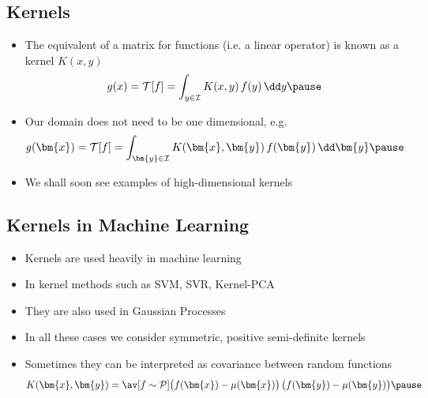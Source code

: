 \begin{slide}
\section{Kernels}

\begin{PauseHighLight}
  \begin{itemize}
  \item The equivalent of a matrix for functions (i.e. a linear
    operator) is known as a kernel $K(x,y)$
    \begin{align*}
      g(x) = \mathcal{T}[f] = \int_{y\in\mathcal{I}} K(x,y)\, f(y) \,
      \dd y\pause
    \end{align*}
  \item Our domain does not need to be one dimensional, e.g.
    \begin{align*}
      g(\bm{x}) = \mathcal{T}[f] = \int_{\bm{y}\in\mathcal{I}}
      K(\bm{x},\bm{y})\, f(\bm{y}) \, \dd \bm{y}\pause
    \end{align*}
  \item We shall soon see examples of high-dimensional kernels\pause
  \end{itemize}
\end{PauseHighLight}

\end{slide}


\begin{slide}
\section[-1]{Kernels in Machine Learning}

\begin{PauseHighLight}
  \begin{itemize}
  \item Kernels are used heavily in machine learning\pause
  \item In kernel methods such as SVM, SVR, Kernel-PCA\pause
  \item They are also used in Gaussian Processes\pause
  \item In all these cases we consider symmetric, positive
    semi-definite kernels\pause
  \item Sometimes they can be interpreted as covariance between random functions
    \begin{align*}
      K(\bm{x},\bm{y})
      = \av[f\sim\mathcal{P}]{\left(\strut f(\bm{x})-\mu(\bm{x})\right)
      \left(\strut f(\bm{y})-\mu(\bm{y})\right)}\pause
    \end{align*}
  \end{itemize}
\end{PauseHighLight}


\end{slide}


